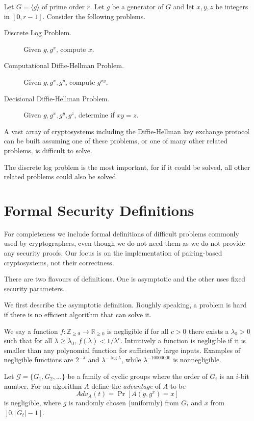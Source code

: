 Let $G = \langle g \rangle$ of prime order $r$.
Let $g$ be a generator of $G$
and let $x, y, z$ be integers in $[0, r-1]$.
Consider the following problems.

\begin{description}
\item [Discrete Log Problem.]
Given $g, g^x$, compute $x$.
\item [Computational Diffie-Hellman Problem.]
Given $g, g^x, g^y$, compute $g^{x y}$.
\item [Decisional Diffie-Hellman Problem.]
Given $g, g^x, g^y, g^z$, determine if $x y = z$.
\end{description}

A vast array of cryptosystems including the Diffie-Hellman key
exchange protocol can be built assuming one of these problems,
or one of many other related problems, is difficult to solve.

The discrete log problem is the most important, for if it could be
solved, all other related problems could also be solved.

\section{Formal Security Definitions}

For completeness we include formal definitions of difficult problems
commonly used by cryptographers, even though
we do not need them as we do not provide any security proofs. Our
focus is on the implementation of pairing-based cryptosystems, not
their correctness.

There are two flavours of definitions. One is asymptotic and the
other uses fixed security parameters.

We first describe the asymptotic definition. Roughly speaking, a problem
is hard if there is no efficient algorithm that can solve it.

We say a function $f:\mathbb{Z}_{\ge 0} \rightarrow \mathbb{R}_{\ge 0}$
is negligible if for all $c > 0$ there exists a $\lambda_0 > 0$ such that
for all $\lambda \ge \lambda_0$, $f(\lambda) < 1 / \lambda^c$.
Intuitively a function is negligible if it is smaller than any polynomial
function for sufficiently large inputs. Examples of negligible functions
are $2^{-\lambda}$ and $\lambda^{-\log\lambda}$, while $\lambda^{-10000000}$
is nonnegligible.

Let $\mathcal G = \{G_1, G_2, ... \}$ be a family of cyclic groups
where the order of $G_i$ is an $i$-bit number.
For an algorithm $A$
define the \emph{advantage} of $A$ to be
\[
Adv_A(t) = \Pr [ A(g, g^x) = x ]
\]
is negligible,
where $g$ is randomly chosen (uniformly) from $G_t$ and $x$ from
$[0, |G_t|-1]$.

